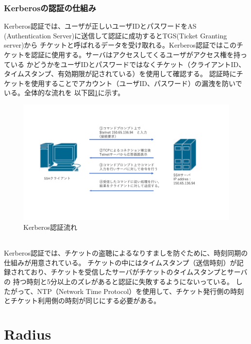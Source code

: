 \documentclass[11pt,a4j,titlepage]{jreport}
\begin{document}
\subsubsection*{Kerberosの認証の仕組み}
Kerberos認証では、ユーザが正しいユーザIDとパスワードをAS\\(Authentication Server)に送信して認証に成功するとTGS(Ticket Granting server)から
チケットと呼ばれるデータを受け取れる。Kerberos認証ではこのチケットを認証に使用する。サーバはアクセスしてくるユーザがアクセス権を持っている
かどうかをユーザIDとパスワードではなくチケット（クライアントID、タイムスタンプ、有効期限が記されている）を使用して確認する。
認証時にチケットを使用することでアカウント（ユーザID、パスワード）の漏洩を防いでいる。全体的な流れを
以下図\ref{KerberosAuthority}に示す。
\begin{figure}[h]
    \begin{flushleft}
        \includegraphics[width=1.0\textwidth, page=12]{graphs/network_archtecture.pdf}
        \caption{Kerberos認証流れ}
        \label{KerberosAuthority}
    \end{flushleft}
\end{figure}\\
Kerberos認証では、チケットの盗聴によるなりすましを防ぐために、時刻同期の仕組みが用意されている。
チケットの中にはタイムスタンプ（送信時刻）が記録されており、チケットを受信したサーバがチケットのタイムスタンプとサーバの
持つ時刻と5分以上のズレがあると認証に失敗するようにないっている。
したがって、NTP（Network Time Protocol）を使用して、チケット発行側の時刻とチケット利用側の時刻が同じにする必要がある。


\section{Radius}
\end{document}
